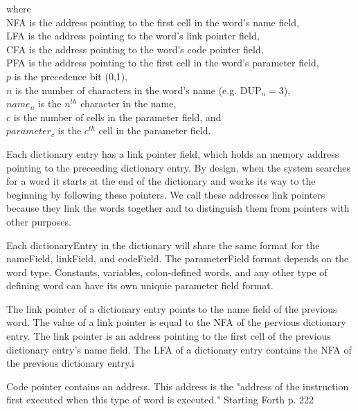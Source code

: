 where \\
NFA is the address pointing to the first cell in the word's name field, \\
LFA is the address pointing to the word's link pointer field, \\
CFA is the address pointing to the word's code pointer field, \\
PFA is the address pointing to the first cell in the word's parameter field, \\
$p$ is the precedence bit (0,1), \\
$n$ is the number of characters in the word's name (e.g. DUP$_n = 3$), \\
$name_n$ is the $n^{th}$ character in the name, \\
$c$ is the number of cells in the parameter field, and \\
$parameter_c$ is the $c^{th}$ cell in the parameter field.


Each dictionary entry has a link pointer field, which holds an memory address pointing to the 
preceeding dictionary entry. By design, when the system searches for a word it starts 
at the end of the dictionary and works its way to the beginning by following these 
pointers. We call these addresses link pointers because they link the words together and to
distinguish them from pointers with other purposes.

Each \gls{dictionaryEntry} in the \gls{dictionary} will share the same format for the \gls{nameField}, \gls{linkField}, and \gls{codeField}. The \gls{parameterField} format depends on the word type. Constants, variables, colon-defined words, and any other type of defining word can have its own uniquie parameter field format.

The link pointer of a dictionary entry points to the name field of the previous word. The value of a link pointer is equal to the NFA of the pervious dictionary entry.
The link pointer is an address pointing to the first cell of the previous dictionary entry's name field. The LFA of a dictionary entry contains the NFA of the previous dictionary entry.i

Code pointer contains an address. This address is the "address of the instruction first executed when this type of word is executed." Starting Forth p. 222

